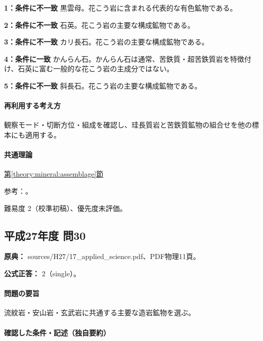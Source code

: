 \noindent\textbf{1：条件に不一致} 黒雲母。花こう岩に含まれる代表的な有色鉱物である。\par

\noindent\textbf{2：条件に不一致} 石英。花こう岩の主要な構成鉱物である。\par

\noindent\textbf{3：条件に不一致} カリ長石。花こう岩の主要な構成鉱物である。\par

\noindent\textbf{4：条件に一致} かんらん石。かんらん石は通常、苦鉄質・超苦鉄質岩を特徴付け、石英に富む一般的な花こう岩の主成分ではない。\par

\noindent\textbf{5：条件に不一致} 斜長石。花こう岩の主要な構成鉱物である。\par

\paragraph{再利用する考え方} 観察モード・切断方位・組成を確認し、珪長質岩と苦鉄質鉱物の組合せを他の標本にも適用する。

\paragraph{共通理論} \hyperref[theory:mineral:assemblage]{第\ref*{theory:mineral:assemblage}節}

\par 参考：\cite{usgs_igneous_components,hom_forsterite}。

\par 難易度 2（校準初稿）、優先度未評価。

\subsection{平成27年度 問30}
\label{q:h27-reg-applied-30}

\noindent\textbf{原典：} sources/H27/17\_applied\_science.pdf、PDF物理11頁。

\textbf{公式正答：} 2（single）。

\paragraph{問題の要旨} 流紋岩・安山岩・玄武岩に共通する主要な造岩鉱物を選ぶ。

\paragraph{確認した条件・記述（独自要約）}\mbox{}\par

